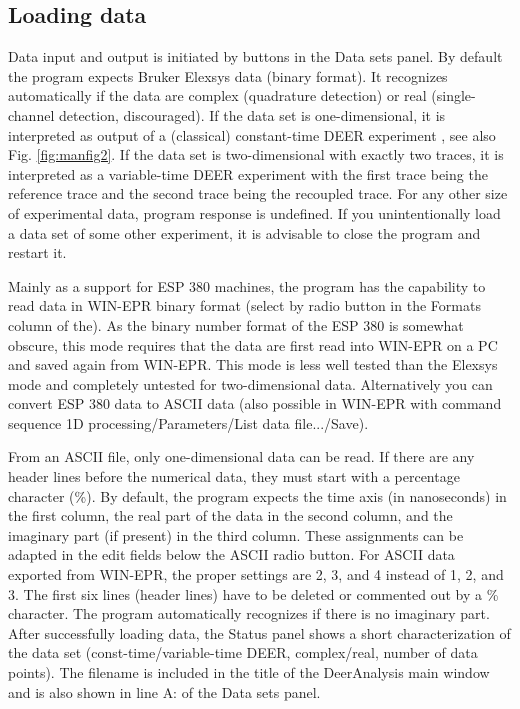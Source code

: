 \documentclass{article}
\begin{document}
\subsection{Loading data}
Data input and output is initiated by buttons in the {\ttfamily Data sets} panel. By default the program expects Bruker Elexsys data (binary format). It recognizes
automatically if the data are complex (quadrature detection) or real
(single-channel detection, discouraged). If the data set is one-dimensional, it
is interpreted as output of a (classical) constant-time DEER experiment \cite{pannier2000}, see also Fig. \ref{fig:manfig2}.
If the data set is two-dimensional with exactly two traces, it is interpreted as
a variable-time DEER experiment \cite{jeschke2004b} with the first trace being the reference
trace and the second trace being the recoupled trace. For any other size of
experimental data, program response is undefined. If you unintentionally load
a data set of some other experiment, it is advisable to close the program and
restart it.

Mainly as a support for ESP 380 machines, the program has the capability
to read data in WIN-EPR binary format (select by radio button in the {\ttfamily Formats}
column of the). As the binary number format of the ESP 380 is somewhat obscure,
this mode requires that the data are first read into WIN-EPR on a PC and
saved again from WIN-EPR. This mode is less well tested than the Elexsys
mode and completely untested for two-dimensional data. Alternatively you can
convert ESP 380 data to ASCII data (also possible in WIN-EPR with command
sequence {\ttfamily 1D processing/Parameters/List data file.../Save}).

From an ASCII file, only one-dimensional data can be read. If there are
any header lines before the numerical data, they must start with a percentage
character (\%). By default, the program expects the time axis (in nanoseconds)
in the first column, the real part of the data in the second column, and the
imaginary part (if present) in the third column. These assignments can be
adapted in the edit fields below the {\ttfamily ASCII} radio button. For ASCII data
exported from WIN-EPR, the proper settings are 2, 3, and 4 instead of 1, 2,
and 3. The first six lines (header lines) have to be deleted or commented out by
a \% character. The program automatically recognizes if there is no imaginary
part. After successfully loading data, the {\ttfamily Status} panel shows a short characterization of the data set (const-time/variable-time
DEER, complex/real, number of data points). The filename is included in the
title of the DeerAnalysis main window and is also shown in line {\ttfamily A:} of the {\ttfamily Data sets} panel.
\end{document}
